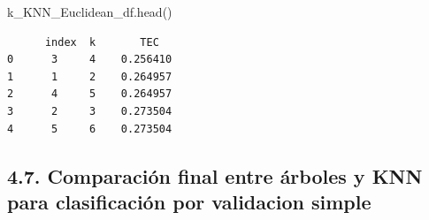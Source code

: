 \documentclass[
  11pt,
  a4paper,
]{article}
\newenvironment{Shaded}{\begin{snugshade}}{\end{snugshade}}
\newcommand{\NormalTok}[1]{#1}
\begin{document}
\begin{Shaded}
\begin{Highlighting}[]
\NormalTok{k\_KNN\_Euclidean\_df.head()}
\end{Highlighting}
\end{Shaded}

\begin{verbatim}
      index  k       TEC
0      3     4    0.256410
1      1     2    0.264957
2      4     5    0.264957
3      2     3    0.273504
4      5     6    0.273504
\end{verbatim}

\newpage

\hypertarget{comparaciuxf3n-final-entre-uxe1rboles-y-knn-para-clasificaciuxf3n-por-validacion-simple}{%
\subsection{4.7. Comparación final entre árboles y KNN para
clasificación por validacion
simple}\label{comparaciuxf3n-final-entre-uxe1rboles-y-knn-para-clasificaciuxf3n-por-validacion-simple}}
\end{document}
